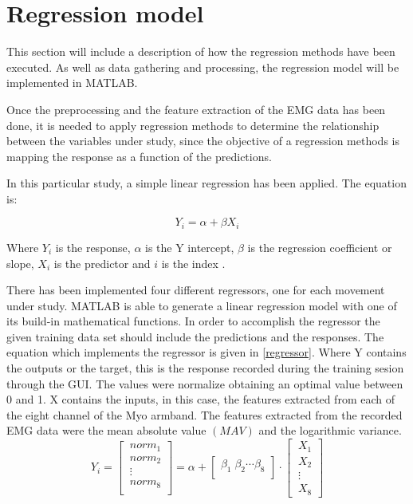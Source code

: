 \section{Regression model}

This section will include a description of how the regression methods have been executed. As well as data gathering and processing, the regression model will be implemented in MATLAB.

Once the preprocessing and the feature extraction of the EMG data has been done, it is needed to apply regression methods to determine the relationship between the variables under study, since the objective of a regression methods is mapping the response  as a function of the predictions.\cite{hahne2014}

In this particular study, a simple linear regression has been applied. The equation is:

\begin{equation}
	Y_i = \alpha + \beta X_i
\end{equation}

Where $Y_i$ is the response, $\alpha$ is the Y intercept, $\beta$ is the regression coefficient or slope, $X_i$ is the predictor and $i$ is the index \cite{zar2009}.

There has been implemented four different regressors, one for each movement under study. MATLAB is able to generate a linear regression model with one of its build-in mathematical functions. In order to accomplish the regressor the given training data set should include the predictions and the responses.
 The equation which implements the regressor is given in \ref{regressor}. Where Y contains the outputs or the target, this is the response recorded during the training sesion through the GUI. The values were normalize obtaining an optimal value between 0 and 1. X contains the inputs, in this case, the features extracted from each of the eight channel of the Myo armband. The features extracted from the recorded EMG data were the mean absolute value $\left( MAV\right)$ and  the logarithmic variance. %
\begin{equation}
	Y_i=\begin{bmatrix} 
	\ norm_1 \\ 
	\ norm_2\\ 
	\ \vdots\\
	\ norm_8\\
	\end{bmatrix}=
	\alpha +
	\begin{bmatrix} 
	\beta_1 \; \beta_2 \cdots \beta_8\\ 
	\end{bmatrix}
	\cdot 
		\begin{bmatrix} 
	\ X_1 \\ 
	\ X_2\\ 
	\ \vdots\\
	\ X_8
	\label{regressor}
	\end{bmatrix}
\end{equation}


